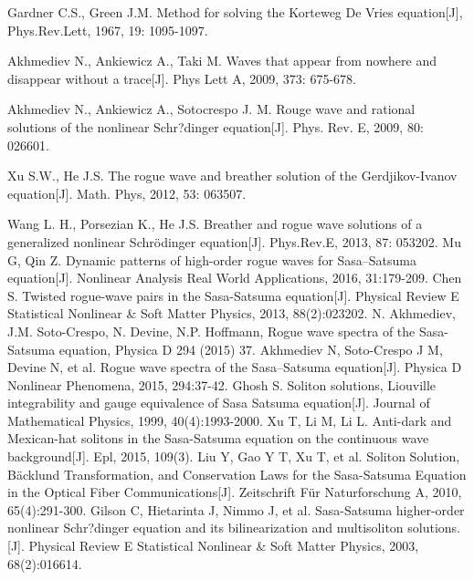 \begin{thebibliography}{0}
Gardner C.S., Green J.M. Method for solving the Korteweg De Vries
equation[J], Phys.Rev.Lett, 1967, 19: 1095-1097.

Akhmediev N., Ankiewicz A., Taki M. Waves that appear from nowhere and disappear without a trace[J]. Phys Lett A, 2009, 373: 675-678.

Akhmediev N., Ankiewicz A., Sotocrespo J. M. Rouge wave and rational solutions of the nonlinear Schr?dinger equation[J]. Phys. Rev. E, 2009, 80: 026601.

Xu S.W., He J.S. The rogue wave and breather solution of the Gerdjikov-Ivanov equation[J]. Math. Phys, 2012, 53: 063507.

Wang L. H., Porsezian K., He J.S. Breather and rogue wave solutions of a generalized nonlinear Schr\"{o}dinger equation[J]. Phys.Rev.E, 2013, 87: 053202. 
Mu G, Qin Z. Dynamic patterns of high-order rogue waves for Sasa–Satsuma equation[J]. Nonlinear Analysis Real World Applications, 2016, 31:179-209. %
Chen S. Twisted rogue-wave pairs in the Sasa-Satsuma equation[J]. Physical Review E Statistical Nonlinear \& Soft Matter Physics, 2013, 88(2):023202.
N. Akhmediev, J.M. Soto-Crespo, N. Devine,  N.P. Hoffmann, Rogue wave spectra of the Sasa-Satsuma equation, Physica D 294 (2015) 37. %
Akhmediev N, Soto-Crespo J M, Devine N, et al. Rogue wave spectra of the Sasa–Satsuma equation[J]. Physica D Nonlinear Phenomena, 2015, 294:37-42.
Ghosh S. Soliton solutions, Liouville integrability and gauge equivalence of Sasa Satsuma equation[J]. Journal of Mathematical Physics, 1999, 40(4):1993-2000.
Xu T, Li M, Li L. Anti-dark and Mexican-hat solitons in the Sasa-Satsuma equation on the continuous wave background[J]. Epl, 2015, 109(3). 
Liu Y, Gao Y T, Xu T, et al. Soliton Solution, Bäcklund Transformation, and Conservation Laws for the Sasa-Satsuma Equation in the Optical Fiber Communications[J]. Zeitschrift Für Naturforschung A, 2010, 65(4):291-300.
Gilson C, Hietarinta J, Nimmo J, et al. Sasa-Satsuma higher-order nonlinear Schr?dinger equation and its bilinearization and multisoliton solutions.[J]. Physical Review E Statistical Nonlinear \& Soft Matter Physics, 2003, 68(2):016614.

\end{thebibliography}
